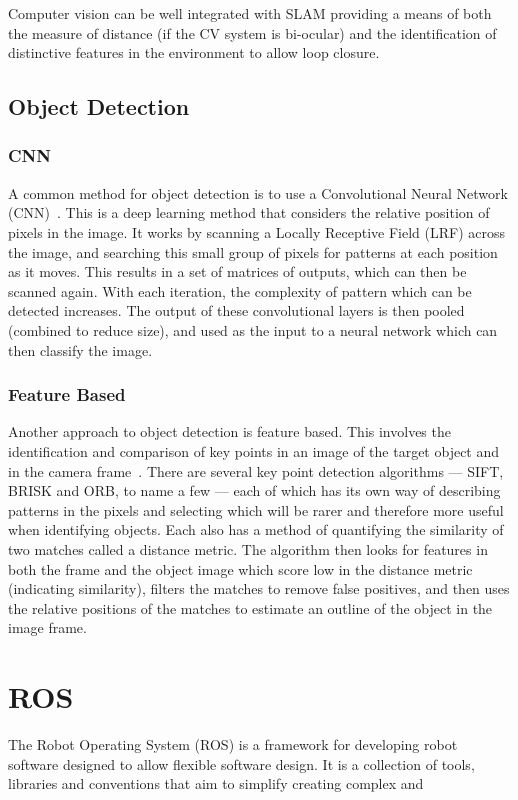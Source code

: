 Computer vision can be well integrated with SLAM providing a means of both the measure
of distance (if the CV system is bi-ocular) and the identification of distinctive
features in the environment to allow loop closure\cite{CVho2006loop}.
\subsection{Object Detection}\label{litreview/cv/objDet}
\subsubsection{CNN}\label{litreview/cv/objDet/CNN}
A common method for object detection is to use a Convolutional 
Neural Network (CNN)~\cite{schmidhuber2015deep}. This is a deep learning method that 
considers the relative position of pixels in the image. It 
works by scanning a Locally Receptive Field (LRF) across the 
image, and searching this small group of pixels for patterns 
at each position as it moves. This results in a set of 
matrices of outputs, which can then be scanned again. With 
each iteration, the complexity of pattern which can be detected 
increases. The output of these convolutional layers is then 
pooled (combined to reduce size), and used as the input to a 
neural network which can then classify the image.


\subsubsection{Feature Based}\label{litreview/cv/objDet/fb}
Another approach to object detection is feature based. This 
involves the identification and comparison of key points in an 
image of the target object and in the camera frame~\cite{lowe2004distinctive}. There are 
several key point detection algorithms --- SIFT, BRISK and ORB, 
to name a few --- each of which has its own way of describing 
patterns in the pixels and selecting which will be rarer and 
therefore more useful when identifying objects. Each also has 
a method of quantifying the similarity of two matches called a 
distance metric. The algorithm then looks for features in both 
the frame and the object image which score low in the distance 
metric (indicating similarity), filters the matches to remove 
false positives, and then uses the relative positions of the 
matches to estimate an outline of the object in the image 
frame. 

\section{ROS}\label{litreview/ROS}
The Robot Operating System (ROS) is a framework for developing robot
software designed to allow flexible software design. It is a collection of tools, 
libraries and conventions that aim to simplify creating complex and 

